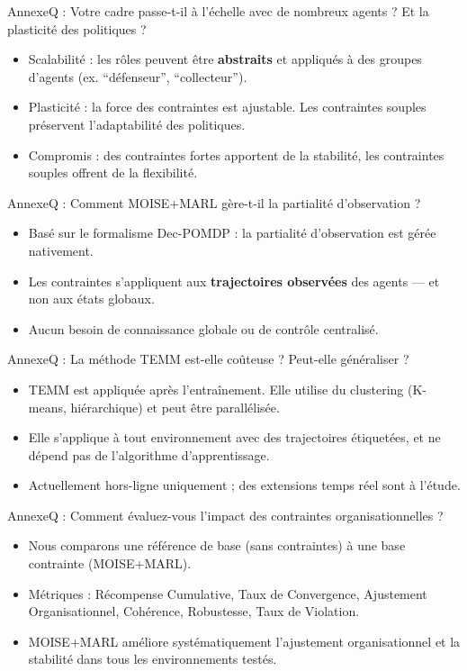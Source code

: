\begin{frame}{Annexe}{Q : Votre cadre passe-t-il à l’échelle avec de nombreux agents ? Et la plasticité des politiques ?}
    \begin{itemize}
        \item Scalabilité : les rôles peuvent être \textbf{abstraits} et appliqués à des groupes d’agents (ex. “défenseur”, “collecteur”).
        \item Plasticité : la force des contraintes est ajustable. Les contraintes souples préservent l’adaptabilité des politiques.
        \item Compromis : des contraintes fortes apportent de la stabilité, les contraintes souples offrent de la flexibilité.
    \end{itemize}
\end{frame}

\begin{frame}{Annexe}{Q : Comment MOISE+MARL gère-t-il la partialité d’observation ?}
    \begin{itemize}
        \item Basé sur le formalisme Dec-POMDP : la partialité d’observation est gérée nativement.
        \item Les contraintes s’appliquent aux \textbf{trajectoires observées} des agents — et non aux états globaux.
        \item Aucun besoin de connaissance globale ou de contrôle centralisé.
    \end{itemize}
\end{frame}

\begin{frame}{Annexe}{Q : La méthode TEMM est-elle coûteuse ? Peut-elle généraliser ?}
    \begin{itemize}
        \item TEMM est appliquée après l'entraînement. Elle utilise du clustering (K-means, hiérarchique) et peut être parallélisée.
        \item Elle s’applique à tout environnement avec des trajectoires étiquetées, et ne dépend pas de l’algorithme d’apprentissage.
        \item Actuellement hors-ligne uniquement ; des extensions temps réel sont à l’étude.
    \end{itemize}
\end{frame}

\begin{frame}{Annexe}{Q : Comment évaluez-vous l’impact des contraintes organisationnelles ?}
    \begin{itemize}
        \item Nous comparons une référence de base (sans contraintes) à une base contrainte (MOISE+MARL).
        \item Métriques : Récompense Cumulative, Taux de Convergence, Ajustement Organisationnel, Cohérence, Robustesse, Taux de Violation.
        \item MOISE+MARL améliore systématiquement l’ajustement organisationnel et la stabilité dans tous les environnements testés.
    \end{itemize}
\end{frame}

